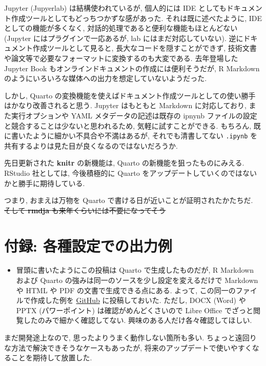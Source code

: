 \documentclass[
  letterpaper,
  DIV=11,
  pandoc,
  ja=standard,
  jafont=noto-otf]{bxjsarticle}
\providecommand{\tightlist}{%
  \setlength{\itemsep}{0pt}\setlength{\parskip}{0pt}}
\begin{document}
Jupyter (Jupyerlab) は結構使われているが, 個人的には IDE
としてもドキュメント作成ツールとしてもどっちつかずな感があった.
それは既に述べたように, IDE としての機能が多くなく,
対話的処理であると便利な機能もほとんどない (Jupyter
にはプラグインで一応あるが, lab にはまだ対応していない).
逆にドキュメント作成ツールとして見ると, 長大なコードを隠すことができず,
技術文書や論文等で必要なフォーマットに変換するのも大変である.
去年登場した Jupyter Book
もオンラインドキュメントの作成には便利そうだが, R Markdown
のようにいろいろな媒体への出力を想定していないようだった.

しかし, Quarto
の変換機能を使えばドキュメント作成ツールとしての使い勝手はかなり改善されると思う.
Jupyter はもともと Markdown に対応しており, また実行オプションや YAML
メタデータの記述は既存の ipnynb
ファイルの設定と競合することは少ないと思われるため,
気軽に試すことができる. もちろん,
既に書いたように細かい不具合や不満はあるが, それでも清書してない
\texttt{.ipynb} を共有するよりは見た目が良くなるのではないだろうか.

先日更新された \textbf{knitr} の新機能は, Quarto
の新機能を狙ったものにみえる. RStudio 社としては, 今後積極的に Quarto
をアップデートしていくのではないかと勝手に期待している.

つまり, おまえは万物を Quarto で書ける日が近いことが証明されたかたちだ.
\sout{そして \textbf{rmdja} も来年くらいには不要になってそう}

\hypertarget{ux4ed8ux9332-ux5404ux7a2eux8a2dux5b9aux3067ux306eux51faux529bux4f8b}{%
\section{付録:
各種設定での出力例}\label{ux4ed8ux9332-ux5404ux7a2eux8a2dux5b9aux3067ux306eux51faux529bux4f8b}}

\begin{itemize}
\tightlist
\item
  冒頭に書いたようにこの投稿は Quarto で生成したものだが, R Markdown
  および Quarto の強みは同一のソースを少し設定を変えるだけで Markdown や
  HTML や PDF の文書で生成できる点にある. よって,
  この同一のファイルで作成した例を
  \href{https://github.com/Gedevan-Aleksizde/quarto-demo-ja}{GitHub}
  に投稿しておいた. ただし, DOCX (Word) や PPTX (パワーポイント)
  は確認がめんどくさいので Libre Office
  でざっと閲覧したのみで細かく確認してない.
  興味のある人だけ各々確認してほしい.
\end{itemize}

まだ開発途上なので, 思ったよりうまく動作しない箇所も多い.
ちょっと遠回りな方法で解決できそうなケースもあったが,
将来のアップデートで使いやすくなることを期待して放置した.
\end{document}
